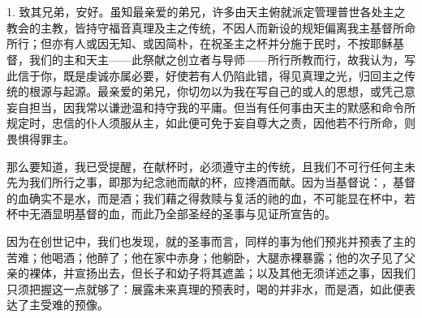 

\section{}

\par

\par

1. 致其兄弟，安好。虽知最亲爱的弟兄，许多由天主俯就派定管理普世各处主之教会的主教，皆持守福音真理及主之传统，不因人而新设的规矩偏离我主基督所命所行；但亦有人或因无知、或因简朴，在祝圣主之杯并分施于民时，不按耶稣基督，我们的主和天主——此祭献之创立者与导师——所行所教而行，故我认为，写此信于你，既是虔诚亦属必要，好使若有人仍陷此错，得见真理之光，归回主之传统的根源与起源。最亲爱的弟兄，你切勿以为我在写自己的或人的思想，或凭己意妄自担当，因我常以谦逊温和持守我的平庸。但当有任何事由天主的默感和命令所规定时，忠信的仆人须服从主，如此便可免于妄自尊大之责，因他若不行所命，则畏惧得罪主。\par

那么要知道，我已受提醒，在献杯时，必须遵守主的传统，且我们不可行任何主未先为我们所行之事，即那为纪念祂而献的杯，应搀酒而献。因为当基督说：，基督的血确实不是水，而是酒；我们藉之得救赎与复活的祂的血，不可能显在杯中，若杯中无酒显明基督的血，而此乃全部圣经的圣事与见证所宣告的。\par

因为在创世记中，我们也发现，就的圣事而言，同样的事为他们预兆并预表了主的苦难；他喝酒；他醉了；他在家中赤身；他躺卧，大腿赤裸暴露；他的次子见了父亲的裸体，并宣扬出去，但长子和幼子将其遮盖；以及其他无须详述之事，因我们只须把握这一点就够了：展露未来真理的预表时，喝的并非水，而是酒，如此便表达了主受难的预像。\par

